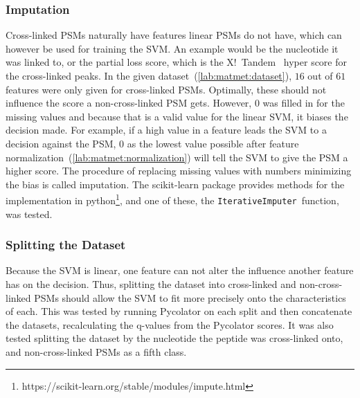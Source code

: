 \subsubsection{Imputation}
\label{lab:matmet:imputation}
Cross-linked PSMs naturally have features linear PSMs do not have, which can however be used for training the SVM. An example would be the nucleotide it was linked to, or the partial loss score, which is the X!~Tandem~\cite{Craig2004} hyper score for the cross-linked peaks. In the given dataset~(\ref{lab:matmet:dataset}), $16$ out of $61$ features were only given for cross-linked PSMs. Optimally, these should not influence the score a non-cross-linked PSM gets. However, $0$ was filled in for the missing values and because that is a valid value for the linear SVM, it biases the decision made. For example, if a high value in a feature leads the SVM to a decision against the PSM, $0$ as the lowest value possible after feature normalization~(\ref{lab:matmet:normalization}) will tell the SVM to give the PSM a higher score. The procedure of replacing missing values with numbers minimizing the bias is called imputation. The scikit-learn package provides methods for the implementation in python\footnote{https://scikit-learn.org/stable/modules/impute.html}, and one of these, the \texttt{IterativeImputer}~function, was tested.
\subsubsection{Splitting the Dataset}
\label{lab:matmet:splitting}
Because the SVM is linear, one feature can not alter the influence another feature has on the decision. Thus, splitting the dataset into cross-linked and non-cross-linked PSMs should allow the SVM to fit more precisely onto the characteristics of each. This was tested by running Pycolator on each split and then concatenate the datasets, recalculating the q-values from the Pycolator scores. It was also tested splitting the dataset by the nucleotide the peptide was cross-linked onto, and non-cross-linked PSMs as a fifth class.
